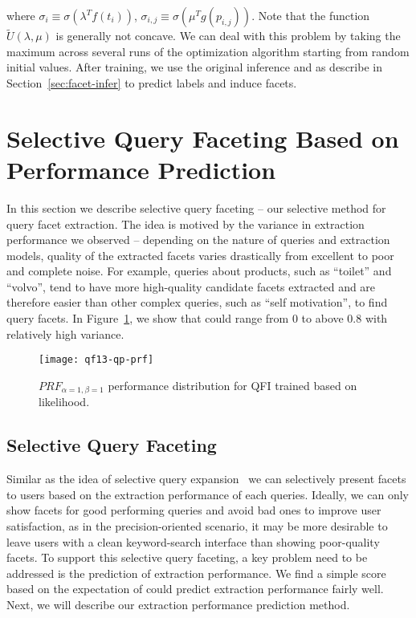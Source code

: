 where $\sigma_i\equiv \sigma(\lambda^T f(t_i))$, $\sigma_{i,j}\equiv \sigma(\mu^T g(p_{i,j}))$. Note that the function $\widetilde{U}(\lambda,\mu)$ is generally not concave. We can deal with this problem by taking the maximum across several runs of the optimization algorithm starting from random initial values. %
After training, we use the original inference \QFI and \QFJ as describe in Section~\ref{sec:facet-infer} to predict labels and induce facets. %


\section{Selective Query Faceting Based on Performance Prediction}
\label{sec:precision-selective}
In this section we describe selective query faceting -- our selective method for query facet extraction. The idea is motived by the variance in extraction performance we observed -- depending on the nature of queries and extraction models, quality of the extracted facets varies drastically from excellent to poor and complete noise.  For example, queries about products, such as ``toilet'' and ``volvo'', tend to have more high-quality candidate facets extracted and are therefore easier than other complex queries, such as ``self motivation'', to find query facets. In Figure~\ref{fig:prf-hist}, we show that \PRF could range from 0 to above 0.8 with relatively high variance.
\begin{figure}[ht!]
\centering
\caption{$P\!R\!F_{\alpha=1,\beta=1}$ performance distribution for QFI trained based on likelihood.}
\label{fig:prf-hist}
\texttt{[image: qf13-qp-prf]}
\end{figure}

\subsection{Selective Query Faceting}
Similar as the idea of selective query expansion~\cite{yom2005learning,amati2004query} we can selectively present facets to users based on the extraction performance of each queries. Ideally, we can only show facets for good performing queries and avoid bad ones to improve user satisfaction, as in the precision-oriented scenario, it may be more desirable to leave users with a clean keyword-search interface than showing poor-quality facets. To support this selective query faceting, a key problem need to be addressed is the prediction of extraction performance. We find a simple score based on the expectation of \PRF could predict extraction performance fairly well. Next, we will describe our extraction performance prediction method.


